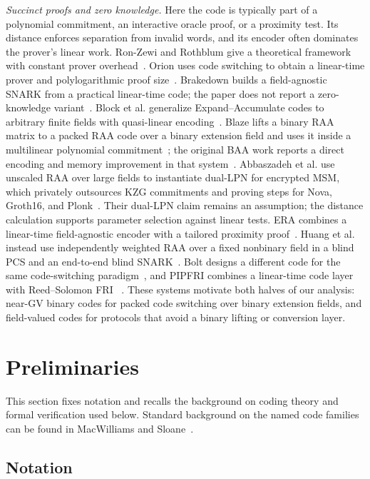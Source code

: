 \documentclass[runningheads,envcountsame,envcountsect]{llncs}
\begin{document}
\emph{Succinct proofs and zero knowledge.}
Here the code is typically part of a polynomial commitment, an interactive
oracle proof, or a proximity test.  Its distance enforces separation from
invalid words, and its encoder often dominates the prover's linear work.
Ron-Zewi and Rothblum give a theoretical framework with constant prover
overhead~\cite{rr25}.  Orion uses code switching to obtain a linear-time prover
and polylogarithmic proof size~\cite{orion22}.  Brakedown builds a field-agnostic
SNARK from a practical linear-time code; the paper does not report a
zero-knowledge variant~\cite{brakedown23}.  Block et al. generalize
Expand--Accumulate codes to arbitrary finite fields with quasi-linear
encoding~\cite{fieldEA24}.  Blaze lifts a binary RAA matrix to a packed RAA code
over a binary extension field and uses it inside a multilinear polynomial
commitment~\cite{blaze25}; the original BAA work reports a direct encoding and
memory improvement in that system~\cite{baa26}.  Abbaszadeh et al. use
unscaled RAA over large fields to instantiate dual-LPN for encrypted MSM,
which privately outsources KZG commitments and proving steps for Nova,
Groth16, and Plonk~\cite{outsourcing26}.  Their dual-LPN claim remains an
assumption; the distance calculation supports parameter selection against
linear tests.  ERA combines a linear-time field-agnostic encoder with a
tailored proximity proof~\cite{era26}.  Huang et al. instead use independently
weighted RAA over a fixed nonbinary field in a blind PCS and an end-to-end
blind SNARK~\cite{blindraa26}.  Bolt
designs a different code for the same code-switching paradigm~\cite{bolt26},
and PIPFRI combines a linear-time code layer with Reed--Solomon FRI
~\cite{pipfri26}.
These systems motivate both halves of our analysis: near-GV binary codes for
packed code switching over binary extension fields, and field-valued codes for
protocols that avoid a binary lifting or conversion layer.

\section{Preliminaries}
\label{sec:preliminaries}

This section fixes notation and recalls the background on coding theory and
formal verification used below.  Standard background on the named code families can be found in
MacWilliams and Sloane~\cite{macwilliams}.

\subsection{Notation}
\end{document}
